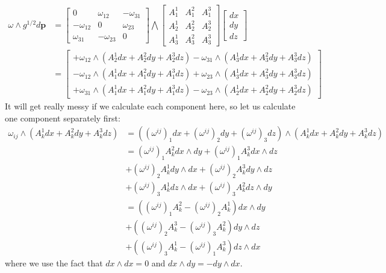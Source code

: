 \documentclass[../thesis.tex]{subfiles}
\begin{document}
\begin{align*}
  \omega \wedge g^{1/2}d\bm{p} &= 
  \begin{bmatrix}
    0 & \omega_{12} & -\omega_{31} \\
    -\omega_{12} & 0 & \omega_{23} \\
    \omega_{31} & -\omega_{23} & 0
   \end{bmatrix}
   \bigwedge \begin{bmatrix}
    A^1_1 & A^2_1 & A^3_1 \\ A^1_2 & A^2_2 & A^3_2 \\ A^1_3 & A^2_3 & A^3_3 
  \end{bmatrix}
  \begin{bmatrix}
    dx \\ dy \\ dz
  \end{bmatrix} \\
  &= \begin{bmatrix}
    +\omega_{12} \wedge (A^1_2dx + A^2_2dy + A^3_2dz) - \omega_{31} \wedge (A^1_3dx + A^2_3dy + A^3_3dz) \\
    -\omega_{12} \wedge (A^1_1dx + A^2_1dy + A^3_1dz) + \omega_{23} \wedge (A^1_3dx + A^2_3dy + A^3_3dz) \\
    +\omega_{31} \wedge (A^1_1dx + A^2_1dy + A^3_1dz) - \omega_{23} \wedge (A^1_2dx+ A^2_2dy + A^3_2dz)
  \end{bmatrix}
\end{align*}
It will get really messy if we calculate each component here, so let us calculate one component separately first:
\begin{align*}
  \omega_{ij} \wedge (A^1_kdx + A^2_kdy + A^3_kdz) &=
  ((\omega^{ij})_1dx + (\omega^{ij})_2dy + (\omega^{ij})_3dz) \wedge (A^1_kdx + A^2_kdy+A^3_kdz) \\
  &= (\omega^{ij})_1 A^2_k dx\wedge dy + (\omega^{ij})_1 A^3_k dx \wedge dz \\
  &+ (\omega^{ij})_2 A^1_k dy\wedge dx + (\omega^{ij})_2 A^3_k dy \wedge dz \\
  &+ (\omega^{ij})_3 A^1_k dz\wedge dx + (\omega^{ij})_3 A^2_k dz \wedge dy \\
  &= ((\omega^{ij})_1A^2_k - (\omega^{ij})_2A^1_k)dx \wedge dy \\
  &+ ((\omega^{ij})_2A^3_k - (\omega^{ij})_3A^2_k)dy \wedge dz \\
  &+ ((\omega^{ij})_3A^1_k - (\omega^{ij})_1A^3_k)dz \wedge dx
\end{align*}
where we use the fact that $dx \wedge dx = 0$ and $dx \wedge dy = -dy \wedge dx$.
\end{document}
